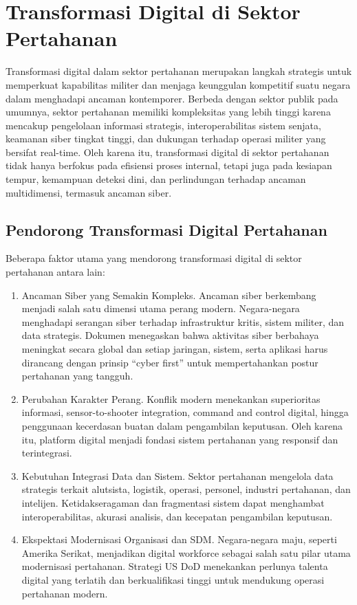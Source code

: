 \section{Transformasi Digital di Sektor Pertahanan}
Transformasi digital dalam sektor pertahanan merupakan langkah strategis untuk memperkuat kapabilitas militer dan menjaga keunggulan kompetitif suatu negara dalam menghadapi ancaman kontemporer.
Berbeda dengan sektor publik pada umumnya, sektor pertahanan memiliki kompleksitas yang lebih tinggi karena mencakup pengelolaan informasi strategis, interoperabilitas sistem senjata, keamanan siber tingkat tinggi, dan dukungan terhadap operasi militer yang bersifat real-time.
Oleh karena itu, transformasi digital di sektor pertahanan tidak hanya berfokus pada efisiensi proses internal, tetapi juga pada kesiapan tempur, kemampuan deteksi dini, dan perlindungan terhadap ancaman multidimensi, termasuk ancaman siber.

\subsection{Pendorong Transformasi Digital Pertahanan}
Beberapa faktor utama yang mendorong transformasi digital di sektor pertahanan antara lain:
\begin{enumerate}
  \item Ancaman Siber yang Semakin Kompleks.
  Ancaman siber berkembang menjadi salah satu dimensi utama perang modern.
  Negara-negara menghadapi serangan siber terhadap infrastruktur kritis, sistem militer, dan data strategis.
  Dokumen \textcite{U.S.DepartmentofDefense2019} menegaskan bahwa aktivitas siber berbahaya meningkat secara global dan setiap jaringan, sistem, serta aplikasi harus dirancang dengan prinsip “cyber first” untuk mempertahankan postur pertahanan yang tangguh.
  \item Perubahan Karakter Perang.
  Konflik modern menekankan superioritas informasi, sensor-to-shooter integration, command and control digital, hingga penggunaan kecerdasan buatan dalam pengambilan keputusan.
  Oleh karena itu, platform digital menjadi fondasi sistem pertahanan yang responsif dan terintegrasi.
  \item Kebutuhan Integrasi Data dan Sistem.
  Sektor pertahanan mengelola data strategis terkait alutsista, logistik, operasi, personel, industri pertahanan, dan intelijen.
  Ketidakseragaman dan fragmentasi sistem dapat menghambat interoperabilitas, akurasi analisis, dan kecepatan pengambilan keputusan.
  \item Ekspektasi Modernisasi Organisasi dan SDM.
  Negara-negara maju, seperti Amerika Serikat, menjadikan digital workforce sebagai salah satu pilar utama modernisasi pertahanan.
  Strategi US DoD menekankan perlunya talenta digital yang terlatih dan berkualifikasi tinggi untuk mendukung operasi pertahanan modern.
\end{enumerate}

